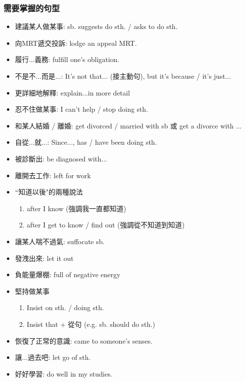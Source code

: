 \subsubsection*{需要掌握的句型}
\begin{multicols}{2}
\begin{itemize}
  \itemsep0em
  \item 建議某人做某事: sb. suggests  do sth. / asks  to do sth.
  \item 向MRT遞交投訴: lodge an appeal  MRT.
  \item 履行...義務: fulfill one's obligation.
  \item 不是不...而是...: It's not that... (接主動句), but it's because / it's just...
  \item 更詳細地解釋: explain...in more detail
  \item 忍不住做某事: I can't help / stop doing sth.
  \item 和某人結婚 / 離婚: get divorced / married with sb 或 get a divorce with ...
  \item 自從...就...: Since..., has / have been doing sth.
  \item 被診斷出: be diagnosed with...
  \item 離開去工作: left for work
  \item ``知道以後"的兩種說法
  \begin{enumerate}
    \itemsep0em
    \item after I know (強調我一直都知道)
    \item after I get to know / find out (強調從不知道到知道)
  \end{enumerate}
  \item 讓某人喘不過氣: suffocate sb.
  \item 發洩出來: let it out
  \item 負能量爆棚: full of negative energy
  \item 堅持做某事
  \begin{enumerate}
    \itemsep0em
    \item Insist on sth. / doing sth.
    \item Insist that + 從句 (e.g. sb. should do sth.)
  \end{enumerate}
  \item 恢復了正常的意識: came to someone's senses.
  \item 讓...過去吧: let go of sth.
  \item 好好學習: do well in my studies.
\end{itemize}
\end{multicols}

